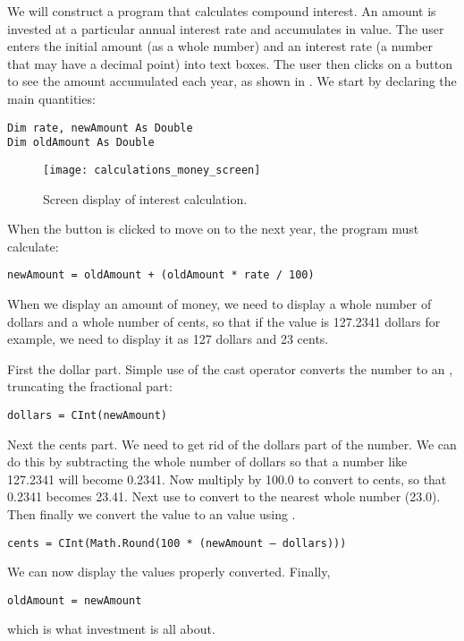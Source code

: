 		We will construct a program that calculates compound interest. An amount is invested at a particular annual interest rate and accumulates in value. The user enters the initial amount (as a whole number) and an interest rate (a number that may have a decimal point) into text boxes. The user then clicks on a button to see the amount accumulated each year, as shown in . We start by declaring the main quantities:
		\begin{lstlisting}
Dim rate, newAmount As Double
Dim oldAmount As Double
		\end{lstlisting}
		\begin{figure}[bth]
			\centering
			\texttt{[image: calculations\_money\_screen]}
			\caption{Screen display of interest calculation.}
			\label{fig:calculations_money_screen}
		\end{figure}


		When the button is clicked to move on to the next year, the program must calculate:
		\begin{lstlisting}
newAmount = oldAmount + (oldAmount * rate / 100)
		\end{lstlisting}
		When we display an amount of money, we need to display a whole number of dollars and a whole number of cents, so that if the value is 127.2341 dollars for example, we need to display it as 127 dollars and 23 cents.
		
		First the dollar part. Simple use of the cast operator  converts the  number to an , truncating the fractional part:
		\begin{lstlisting}
dollars = CInt(newAmount)
		\end{lstlisting}
		Next the cents part. We need to get rid of the dollars part of the number. We can do this by subtracting the whole number of dollars so that a number like 127.2341 will become 0.2341. Now multiply by 100.0 to convert to cents, so that 0.2341 becomes 23.41. Next use  to convert to the nearest whole number (23.0). Then finally we convert the  value to an  value using .
		\begin{lstlisting}
cents = CInt(Math.Round(100 * (newAmount – dollars)))
		\end{lstlisting}
		We can now display the values properly converted. Finally,
		\begin{lstlisting}
oldAmount = newAmount
		\end{lstlisting}
		which is what investment is all about.
		

